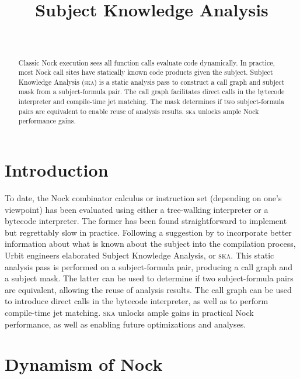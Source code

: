 \documentclass[twoside]{article}
\title{Subject Knowledge Analysis}
\author{\authorname~\authorpatp \\ \affiliation}
\date{}
\begin{document}
\maketitle
\thispagestyle{firststyle}

\begin{abstract}
  \sloppy
Classic Nock execution sees all function calls evaluate code dynamically.  In practice, most Nock call sites have statically known code products given the subject.  Subject Knowledge Analysis (\textsc{ska}) is a static analysis pass to construct a call graph and subject mask from a subject-formula pair.  The call graph facilitates direct calls in the bytecode interpreter and compile-time jet matching.  The mask determines if two subject-formula pairs are equivalent to enable reuse of analysis results.  \textsc{ska} unlocks ample Nock performance gains.
\end{abstract}

\setcounter{page}{43}

\tableofcontents

\section{Introduction}

\sloppy
To date, the Nock combinator calculus or instruction set (\mbox{depending} on one's viewpoint) has been evaluated using \mbox{either} a tree-walking interpreter or a bytecode interpreter.  The former has been found straightforward to implement but \mbox{regrettably} slow in practice.  Following a suggestion by  to incorporate better information about what is known about the subject into the compilation process, \mbox{Urbit} engineers elaborated Subject Knowledge Analysis, or \textsc{ska}.  This static analysis pass is performed on a subject-formula pair, \mbox{producing} a call graph and a subject mask.  The latter can be used to determine if two subject-formula pairs are equivalent, allowing the reuse of analysis results.  The call graph can be used to introduce direct calls in the bytecode interpreter, as well as to perform compile-time jet matching.  \textsc{ska} unlocks \mbox{ample} gains in practical Nock performance, as well as enabling future optimizations and analyses.

\section{Dynamism of Nock}
\end{document}
